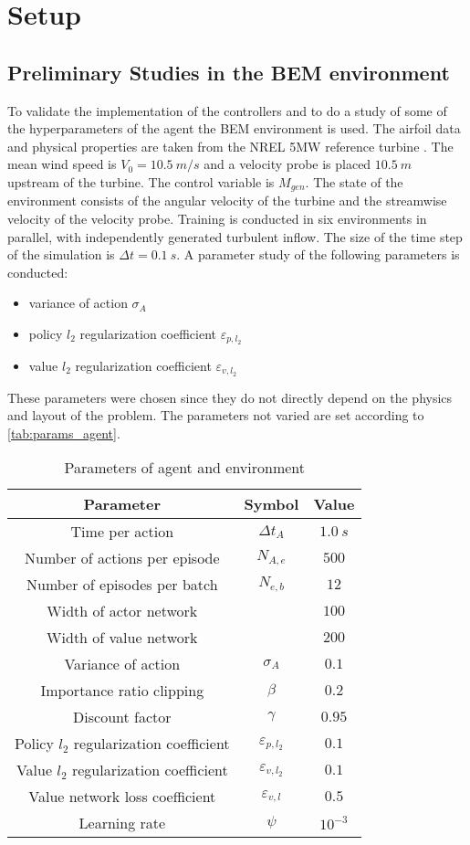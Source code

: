 \section{Setup}
\subsection{Preliminary Studies in the BEM environment}
To validate the implementation of the controllers and to do a study of some of the hyperparameters of the agent the BEM environment is used. The airfoil data and physical properties are taken from the NREL 5MW reference turbine \cite{jonkman_definition_2009}. The mean wind speed is $V_0=\SI{10.5}{m/s}$ and a velocity probe is placed $\SI{10.5}{m}$ upstream of the turbine.
The control variable is $M_{gen}$. The state of the environment consists of the angular velocity of the turbine and the streamwise velocity of the velocity probe. Training is conducted in six environments in parallel, with independently generated turbulent inflow. The size of the time step of the simulation is $\Delta t = \SI{0.1}{s}$.
A parameter study of the following parameters is conducted:
\begin{itemize}
	\item variance of action $\sigma_A$
	\item policy $l_2$ regularization coefficient $\varepsilon_{p,l_2}$
	\item value $l_2$ regularization coefficient $\varepsilon_{v,l_2}$
\end{itemize}
These parameters were chosen since they do not directly depend on the physics and layout of the problem. The parameters not varied are set according to \autoref{tab:params_agent}.
\begin{table}[h]
	\centering
	\caption{Parameters of agent and environment}
	\begin{tabular}{ccc}
		\toprule
		Parameter & Symbol & Value \\
		\midrule
		Time per action & $\Delta t_A$ & $\SI{1.0}{s}$ \\ 
		Number of actions per episode & $N_{A,e}$ & $500$ \\
		Number of episodes per batch & $N_{e,b}$ & $12$ \\
		Width of actor network & & $100$ \\ 
		Width of value network & & $200$ \\ 
		Variance of action & $\sigma_A$ & $0.1$ \\ 
		Importance ratio clipping & $\beta$ & $0.2$ \\ 
		Discount factor & $\gamma$ & $0.95$ \\ 
		Policy $l_2$ regularization coefficient & $\varepsilon_{p,l_2} $ & $0.1$ \\ 
		Value $l_2$ regularization coefficient & $\varepsilon_{v,l_2}$ & $0.1$ \\ 
		Value network loss coefficient & $\varepsilon_{v,l}$ & $0.5$ \\ 
		Learning rate & $\psi$ & $10^{-3}$ \\
		\bottomrule
	\end{tabular}
	\label{tab:params_agent}
\end{table}
